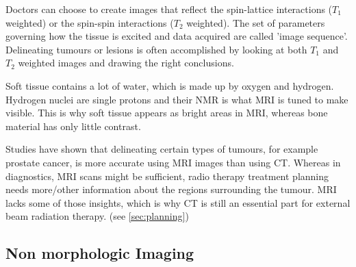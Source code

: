 Doctors can choose to create images that reflect the spin-lattice interactions ($T_1$ weighted) or the spin-spin interactions ($T_2$ weighted). 
The set of parameters governing how the tissue is excited and data acquired are called 'image sequence'.
Delineating tumours or lesions is often accomplished by looking at both $T_1$ and $T_2$ weighted images and drawing the right conclusions.

Soft tissue contains a lot of water, which is made up by oxygen and hydrogen.
Hydrogen nuclei are single protons and their NMR is what MRI is tuned to make visible.
This is why soft tissue appears as bright areas in MRI, whereas bone material has only little contrast. \cite{Currie2013}

Studies have shown that delineating certain types of tumours, for example prostate cancer, is more accurate using MRI images than using CT. \cite{Rasch1999, Debois1999a, Roach1996}
Whereas in diagnostics, MRI scans might be sufficient, radio therapy treatment planning needs more/other information about the regions surrounding the tumour.
MRI lacks some of those insights, which is why CT is still an essential part for external beam radiation therapy. (see \ref{sec:planning})

\subsection{Non morphologic Imaging}


